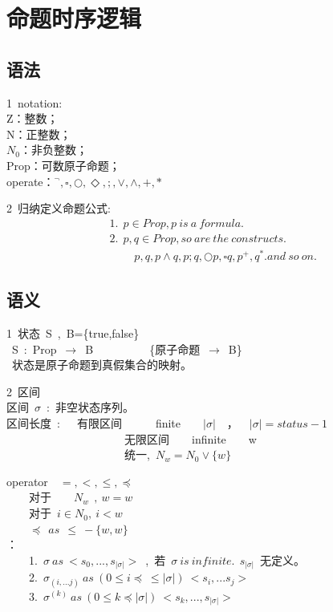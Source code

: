 \section{命题时序逻辑}
\subsection{语法}
\noindent\textcircled{\footnotesize{1}}~notation: \\
   \indent Z：整数；\\
   \indent N：正整数；\\
   \indent $N_0$：非负整数；\\
   \indent Prop：可数原子命题；\\
   \indent operate：${^\lnot},\square,\bigcirc,\Diamond,;,\vee,\wedge,+,*$

\noindent\textcircled{\footnotesize{2}}~归纳定义命题公式:
\begin{equation}\nonumber
\begin{split}
&1.~~p\in Prop,p ~is ~a ~formula.\\
&2.~~p,q \in Prop,so ~are ~the ~constructs.\\
&~~~~~~~~~~p,q,p\wedge q,p;q,\bigcirc p,\square q,p^+,q^*.and~so~on.
\end{split}
\end{equation}

\subsection{语义}
\noindent\textcircled{\footnotesize{1}}~状态~S~,~B=\{true,false\}\\
\indent ~S~:~Prop~$\rightarrow$~B~~~~~~~~~~\{原子命题~$\rightarrow$~B\}\\
\indent ~状态是原子命题到真假集合的映射。

\noindent\textcircled{\footnotesize{2}}~区间\\
\indent 区间~$\sigma$~:~非空状态序列。\\
\indent 区间长度~:~~~有限区间~~~~~~finite~~~~$|\sigma|$~~，~~$|\sigma|=status-1$ \\
\indent~~~~~~~~~~~~~~~~~~~~~无限区间~~~~infinite~~~~w\\
\indent~~~~~~~~~~~~~~~~~~~~~统一{\color{red}{$\bigstar$}},~$N_w=N_0\vee\{w\}$

operator~~$=,<,\leq,\preceq$\\
\indent~~~~对于~~~~$N_w~~,~w=w$\\
\indent~~~~对于~$i\in N_0,~i<w$\\
\indent~~~~$\preceq~~as~~\leq~-\{{w,w}\}$\\
：\\
\indent~~~~1.~$\sigma~as~<s_0,...,s_{|\sigma|}>$~,~若~$\sigma~is~infinite.~~s_{|\sigma|}$~无定义。\\
\indent~~~~2.~$\sigma_{(i,...j)}~as~(0\leq i\preceq ~\leq |\sigma|)~<s_i,...s_j>$\\
\indent~~~~3.~$\sigma^{(k)}~as~(0\leq k \preceq |\sigma|)~<s_k,...,s_{|\sigma|}>$\\


